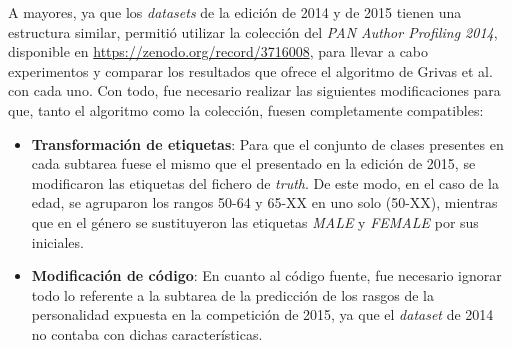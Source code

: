 \bigskip
\begin{table}[H]
	\centering
	\caption{Resultados de las pruebas realizadas con el algoritmo de Grivas et al. \cite{grivas2015author}}
	\label{tab:pruebas_grivas}
\end{table}

\bigskip
A mayores, ya que los \textit{datasets} de la edición de 2014 y de 2015 tienen una estructura similar, permitió utilizar la colección
del \textit{PAN Author Profiling 2014}, disponible en \url{https://zenodo.org/record/3716008}, para llevar a cabo experimentos y comparar los resultados que ofrece el algoritmo
de Grivas et al. \cite{grivas2015author} con cada uno. Con todo, fue necesario realizar las siguientes modificaciones para que, tanto el algoritmo
como la colección, fuesen completamente compatibles:

\begin{itemize}
	\item \textbf{Transformación de etiquetas}: Para que el conjunto de clases presentes en cada subtarea fuese el mismo que el presentado en la edición de 2015, se modificaron
	      las etiquetas del fichero de \textit{truth}. De este modo, en el caso de la edad, se agruparon los rangos 50-64 y 65-XX en uno solo (50-XX), mientras que en el género se sustituyeron
	      las etiquetas \textit{MALE} y \textit{FEMALE} por sus iniciales.
	\item \textbf{Modificación de código}: En cuanto al código fuente, fue necesario ignorar todo lo referente a la subtarea de la predicción de los rasgos de la personalidad
	      expuesta en la competición de 2015, ya que el \textit{dataset} de 2014 no contaba con dichas características.
\end{itemize}

